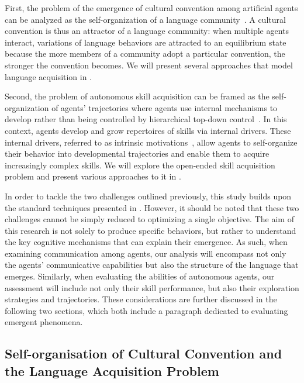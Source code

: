  First, the problem of the emergence of cultural convention among artificial agents can be analyzed as the self-organization of a language community~\citep{steels1995selforganizing,oudeyer2005selforganization}. A cultural convention is thus an attractor of a language community: when multiple agents interact, variations of language behaviors are attracted to an equilibrium state because the more members of a community adopt a particular convention, the stronger the convention becomes. We will present several approaches that model language acquisition in . 

Second, the problem of autonomous skill acquisition can be framed as the self-organization of agents' trajectories where agents use internal mechanisms to develop rather than being controlled by hierarchical top-down control~\citep{pfeifer2007robotics}. In this context, agents develop and grow repertoires of skills via internal drivers. These internal drivers, referred to as intrinsic motivations~\citep{oudeyer2005selforganization}, allow agents to self-organize their behavior into developmental trajectories and enable them to acquire increasingly complex skills. We will explore the open-ended skill acquisition problem and present various approaches to it in .

In order to tackle the two challenges outlined previously, this study builds upon the standard \ai techniques presented in . However, it should be noted that these two challenges cannot be simply reduced to optimizing a single objective. The aim of this research is not solely to produce specific behaviors, but rather to understand the key cognitive mechanisms that can explain their emergence. As such, when examining communication among agents, our analysis will encompass not only the agents' communicative capabilities but also the structure of the language that emerges. Similarly, when evaluating the abilities of autonomous agents, our assessment will include not only their skill performance, but also their exploration strategies and trajectories. These considerations are further discussed in the following two sections, which both include a paragraph dedicated to evaluating emergent phenomena.

\newpage
\subsection{Self-organisation of Cultural Convention and the Language Acquisition Problem}
\label{sec:self-orga-lang}

